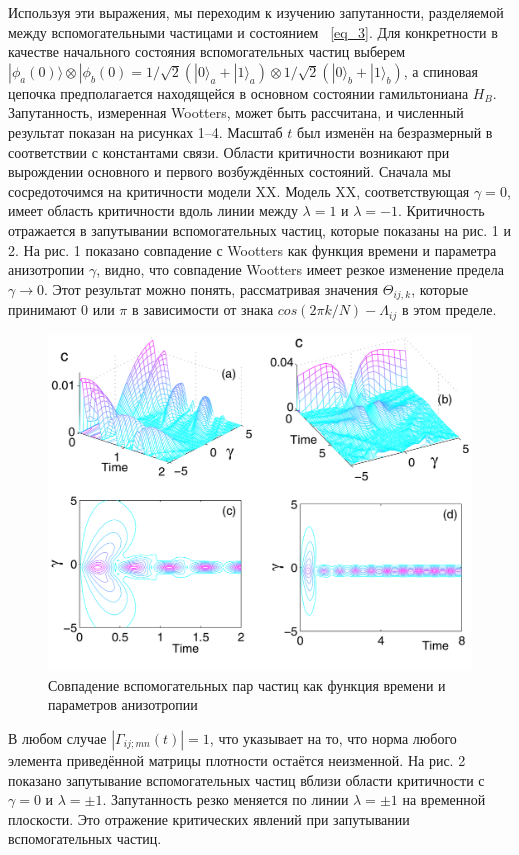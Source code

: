 \documentclass[11pt]{article}
\begin{document}
Используя эти выражения, мы переходим к изучению запутанности, разделяемой между вспомогательными частицами и состоянием ~\ref{eq_3}. Для конкретности в качестве начального состояния вспомогательных частиц выберем $|\phi_a(0) \rangle \otimes |\phi_b(0) = 1/\sqrt{2}(|0\rangle_a+|1\rangle_a) \otimes 1/\sqrt{2}(|0\rangle_b+|1\rangle_b)$, а спиновая цепочка предполагается находящейся в основном состоянии гамильтониана $H_B$. Запутанность, измеренная Wootters, может быть рассчитана, и численный результат показан на рисунках 1–4. Масштаб $t$ был изменён на безразмерный в соответствии с константами связи. Области критичности возникают при вырождении основного и первого возбуждённых состояний. Сначала мы сосредоточимся на критичности модели XX. Модель XX, соответствующая $\gamma=0$, имеет область критичности вдоль линии между $\lambda= 1$ и $\lambda = -1$. Критичность отражается в запутывании вспомогательных частиц, которые показаны на рис. 1 и 2. На рис. 1 показано совпадение с Wootters как функция времени и параметра анизотропии $\gamma$, видно, что совпадение Wootters имеет резкое изменение предела $\gamma → 0$. Этот результат можно понять, рассматривая значения $\Theta_{ij,k}$, которые принимают 0 или $\pi$ в зависимости от знака $cos(2\pi k/N) - \Lambda_{ij}$ в этом пределе.
\begin{figure}[htp]
	\centering
	\includegraphics[scale=0.3]{fig1}
	\caption {Совпадение вспомогательных пар частиц как функция времени и параметров анизотропии ~\cite{yi}}
	\label{}
\end{figure}

В любом случае $|\Gamma_{ij;mn}(t)|=1$, что указывает на то, что норма любого элемента приведённой матрицы плотности остаётся неизменной. На рис. 2 показано запутывание вспомогательных частиц вблизи области критичности с $\gamma = 0$ и $\lambda = ± 1$. Запутанность резко меняется по линии $\lambda = ± 1$ на временной плоскости. Это отражение критических явлений при запутывании вспомогательных частиц.
\end{document}
